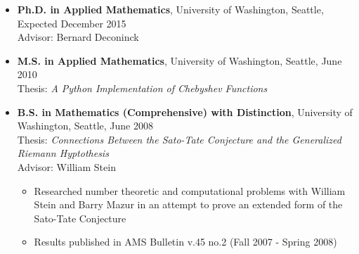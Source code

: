 \documentclass{article}
\begin{document}
\begin{itemize}
  \setlength{\itemsep}{0pt}
  \item {\bf Ph.D. in Applied Mathematics}, University of Washington,
    Seattle, Expected December 2015 \\ Advisor: Bernard Deconinck
  \item {\bf M.S. in Applied Mathematics}, University of Washington,
    Seattle, June 2010 \\ Thesis: {\it A Python Implementation
      of Chebyshev Functions}
  \item {\bf B.S. in Mathematics (Comprehensive) with Distinction},
    University of Washington, Seattle, June 2008 \\ Thesis: {\it
      Connections Between the Sato-Tate Conjecture and the Generalized
      Riemann Hyptothesis} \\ Advisor: William Stein
   \begin{itemize}
     \item Researched number theoretic and computational problems with
       William Stein and Barry Mazur in an attempt to prove an extended
       form of the Sato-Tate Conjecture
     \item Results published in AMS Bulletin v.45 no.2 (Fall 2007 -
       Spring 2008)
   \end{itemize}
\end{itemize}
\end{document}
